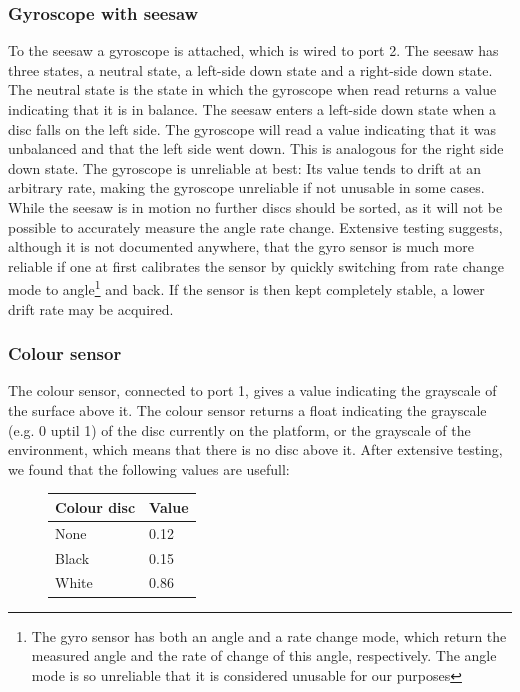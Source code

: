 \documentclass[a4paper,oneside,11pt]{article}
\begin{document}
\subsubsection{Gyroscope with seesaw}
To the seesaw a gyroscope is attached, which is wired to port 2. The seesaw has three states, a neutral state, a left-side down state and a right-side down state. The neutral state is the state in which the gyroscope when read returns a value indicating that it is in balance. The seesaw enters a left-side down state when a disc falls on the left side. The gyroscope will read a value indicating that it was unbalanced and that the left side went down.
This is analogous for the right side down state. The gyroscope is unreliable at best: Its value tends to drift at an arbitrary rate, making the gyroscope unreliable if not unusable in some cases. While the seesaw is in motion no further discs should be sorted, as it will not be possible to accurately measure the angle rate change. Extensive testing suggests, although it is not documented anywhere, that the gyro sensor is much more reliable if one at first calibrates the sensor by quickly switching from rate change mode to angle\footnote{The gyro sensor has both an angle and a rate change mode, which return the measured angle and the rate of change of this angle, respectively. The angle mode is so unreliable that it is considered unusable for our purposes} and back. If the sensor is then kept completely stable, a lower drift rate may be acquired.

\subsubsection{Colour sensor}
The colour sensor, connected to port 1, gives a value indicating the grayscale of the surface above it. The colour sensor returns a float indicating the grayscale (e.g. 0 uptil 1) of the disc currently on the platform, or the grayscale of the environment, which means that there is no disc above it. After extensive testing, we found that the following values are usefull:

\begin{figure}[H]
\begin{tabular}{|l|l|}
\hline
\textbf{Colour disc} & \textbf{Value} \\
\hline
None & 0.12 \\
Black & 0.15 \\
White & 0.86 \\
\hline
\end{tabular}
\end{figure}
\end{document}
